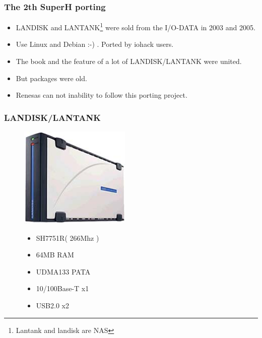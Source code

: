 \documentclass[cjk,dvipdfm,12pt]{beamer}
\begin{document}
\begin{frame}
 \frametitle{The 2th SuperH porting}
  \begin{itemize}
    \item LANDISK and LANTANK\footnote{Lantank and landisk are NAS} were sold from the I/O-DATA in 2003 and 2005.
    \item Use Linux and Debian :-) . Ported by iohack users.
    \item The book and the feature of a lot of LANDISK/LANTANK were united. 
    \item But packages were old.
    \item Renesas can not inability to follow this porting project.
  \end{itemize}
\end{frame}


\begin{frame}
 \frametitle{LANDISK/LANTANK}

\begin{figure}
 \begin{minipage}[t]{0.6\hsize}
   \includegraphics[width=0.5\hsize]{image200705/landisk00.jpg}
 \end{minipage}
 \begin{minipage}[t]{0.5\hsize}
  \begin{itemize}
   \item SH7751R( 266Mhz )
   \item 64MB RAM
   \item UDMA133 PATA 
   \item 10/100Base-T x1
   \item USB2.0 x2 
  \end{itemize}
 \end{minipage}
\end{figure}
\end{frame}
\end{document}
